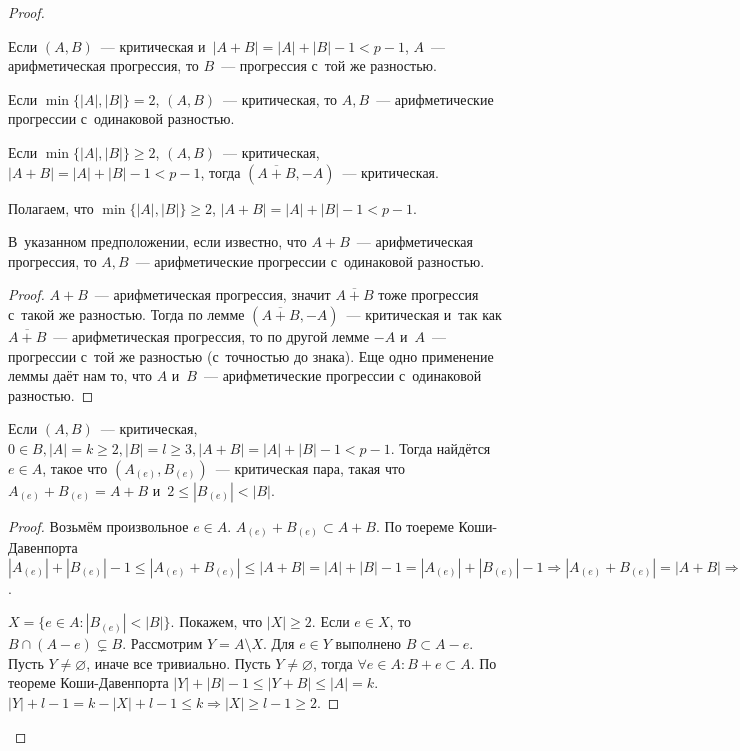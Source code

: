 \documentclass{article}
\begin{document}
\begin{proof}
	\begin{lemma}
		Если $(A, B)$~--- критическая и~$|A + B| = |A| + |B| - 1 < p - 1$, $A$~---
		арифметическая прогрессия, то $B$~--- прогрессия с~той же разностью.
	\end{lemma}
	\begin{lemma}
		Если $\min\{|A|,|B|\} = 2$, $(A, B)$~--- критическая, то $A, B$~---
		арифметические прогрессии с~одинаковой разностью.
	\end{lemma}
	\begin{lemma}
		Если $\min\{|A|,|B|\} \ge 2$, $(A, B)$~--- критическая, $|A + B| = |A| + |B|
		- 1 < p - 1$, тогда $(\overline{A+B}, -A)$~--- критическая.
	\end{lemma}

	Полагаем, что $\min\{|A|,|B|\} \ge 2$, $|A + B| = |A| + |B| - 1 < p - 1$.
	\begin{lemma}
		В~указанном предположении, если известно, что $A + B$~--- арифметическая
		прогрессия, то $A, B$~--- арифметические прогрессии с~одинаковой разностью.
	\end{lemma}
	\begin{proof}
		$A + B$~--- арифметическая прогрессия, значит $\overline{A + B}$ тоже
		прогрессия с~такой же разностью. Тогда по лемме $(\overline{A + B},
		-A)$~--- критическая и~так как $\overline{A + B}$~--- арифметическая
		прогрессия, то по другой лемме $-A$ и~$A$~--- прогрессии с~той же разностью
		(с~точностью до знака). Еще одно применение леммы даёт нам то, что $A$
		и~$B$~--- арифметические прогрессии с~одинаковой разностью.
	\end{proof}

	\begin{lemma}
		Если $(A, B)$~--- критическая, $0 \in B, |A| = k \ge 2, |B| = l \ge 3,
		|A + B| = |A| + |B| - 1 < p - 1$. Тогда найдётся $e \in A$, такое что
		$(A_{(e)}, B_{(e)})$~--- критическая пара, такая что $A_{(e)} + B_{(e)} = A
		+ B$ и~$2 \le |B_{(e)}| < |B|$.
	\end{lemma}
	\begin{proof}
		Возьмём произвольное $e \in A$. $A_{(e)} + B_{(e)} \subset A + B$. По
		тоереме Коши-Давенпорта $|A_{(e)}| + |B_{(e)}| - 1 \le |A_{(e)} + B_{(e)}|
		\le |A + B| = |A| + |B| - 1 = |A_{(e)}| + |B_{(e)}| - 1 \Rightarrow |A_{(e)}
		+ B_{(e)}| = |A + B| \Rightarrow A_{(e)} + B_{(e)} = A + B$.

		$X = \{e \in A: |B_{(e)}| < |B|\}$. Покажем, что $|X| \ge 2$. Если $e \in
		X$, то $B \cap (A - e) \subsetneq B$. Рассмотрим $Y = A \setminus X$. Для $e
		\in Y$ выполнено $B \subset A - e$. Пусть $Y \ne \varnothing$, иначе все
		тривиально. Пусть $Y \ne \varnothing$, тогда $\forall e \in A: B + e \subset
		A$. По теореме Коши-Давенпорта $|Y| + |B| - 1\le |Y + B| \le |A| = k$. $|Y|
		+ l - 1 = k - |X| + l - 1 \le k \Rightarrow |X| \ge l - 1 \ge 2$.


\end{proof}
\end{proof}
\end{document}
